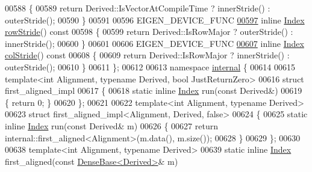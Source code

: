 \begin{DoxyCode}
00588 \textcolor{keyword}{    }\{
00589       \textcolor{keywordflow}{return} Derived::IsVectorAtCompileTime ? innerStride() : outerStride();
00590     \}
00591 
00596     EIGEN\_DEVICE\_FUNC
\hyperlink{group___core___module_a922802af1c7db5993a8af2fb7634592f}{00597}     \textcolor{keyword}{inline} \hyperlink{group___core___module_a554f30542cc2316add4b1ea0a492ff02}{Index} \hyperlink{group___core___module_a922802af1c7db5993a8af2fb7634592f}{rowStride}()\textcolor{keyword}{ const}
00598 \textcolor{keyword}{    }\{
00599       \textcolor{keywordflow}{return} Derived::IsRowMajor ? outerStride() : innerStride();
00600     \}
00601 
00606     EIGEN\_DEVICE\_FUNC
\hyperlink{group___core___module_af7fa6b77bd024be97c02766261e52714}{00607}     \textcolor{keyword}{inline} \hyperlink{group___core___module_a554f30542cc2316add4b1ea0a492ff02}{Index} \hyperlink{group___core___module_af7fa6b77bd024be97c02766261e52714}{colStride}()\textcolor{keyword}{ const}
00608 \textcolor{keyword}{    }\{
00609       \textcolor{keywordflow}{return} Derived::IsRowMajor ? innerStride() : outerStride();
00610     \}
00611 \};
00612 
00613 \textcolor{keyword}{namespace }\hyperlink{namespaceinternal}{internal} \{
00614 
00615 \textcolor{keyword}{template}<\textcolor{keywordtype}{int} Alignment, \textcolor{keyword}{typename} Derived, \textcolor{keywordtype}{bool} JustReturnZero>
00616 \textcolor{keyword}{struct }first\_aligned\_impl
00617 \{
00618   \textcolor{keyword}{static} \textcolor{keyword}{inline} \hyperlink{group___core___module_a554f30542cc2316add4b1ea0a492ff02}{Index} run(\textcolor{keyword}{const} Derived&)
00619   \{ \textcolor{keywordflow}{return} 0; \}
00620 \};
00621 
00622 \textcolor{keyword}{template}<\textcolor{keywordtype}{int} Alignment, \textcolor{keyword}{typename} Derived>
00623 \textcolor{keyword}{struct }first\_aligned\_impl<Alignment, Derived, false>
00624 \{
00625   \textcolor{keyword}{static} \textcolor{keyword}{inline} \hyperlink{group___core___module_a554f30542cc2316add4b1ea0a492ff02}{Index} run(\textcolor{keyword}{const} Derived& m)
00626   \{
00627     \textcolor{keywordflow}{return} internal::first\_aligned<Alignment>(m.data(), m.size());
00628   \}
00629 \};
00630 
00638 \textcolor{keyword}{template}<\textcolor{keywordtype}{int} Alignment, \textcolor{keyword}{typename} Derived>
00639 \textcolor{keyword}{static} \textcolor{keyword}{inline} \hyperlink{group___core___module_a554f30542cc2316add4b1ea0a492ff02}{Index} first\_aligned(\textcolor{keyword}{const} \hyperlink{group___core___module_class_eigen_1_1_dense_base}{DenseBase<Derived>}& m)

\end{DoxyCode}
